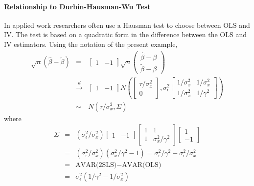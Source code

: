 \documentclass[12pt]{article}
\theoremstyle{definition}
\begin{document}
\paragraph{Relationship to Durbin-Hausman-Wu Test} In applied work researchers often use a Hausman test to choose between OLS and IV. The test is based on a quadratic form in the difference between the OLS and IV estimators. Using the notation of the present example, 
  \begin{eqnarray*}
    \sqrt{n}\left(\widehat{\beta} - \widetilde{\beta}\right) &=&\left[\begin{array}{cc}
    1 & -1
    \end{array}\right] \sqrt{n} \left(\begin{array}{c}
    \widehat{\beta} - \beta  \\ \widetilde{\beta} - \beta
    \end{array} \right)\\
     &\overset{d}{\rightarrow}& \left[\begin{array}{cc}
    1 & -1
    \end{array}\right]
    N\left(\left[
      \begin{array}{c}
        \tau/\sigma_x^2 \\ 0
      \end{array}\right],\sigma_\epsilon^2\left[
        \begin{array}{cc}
          1/\sigma_x^2 & 1/\sigma_x^2 \\
          1/\sigma_x^2 & 1/\gamma^2
        \end{array}
      \right]
    \right)\\
    &\sim& N\left(\tau/\sigma_x^2, \Sigma
    \right)
  \end{eqnarray*}
where
    \begin{eqnarray*}
      \Sigma &=& (\sigma_\epsilon^2/\sigma_x^2) \left[\begin{array}{cc}
    1 & -1
    \end{array}\right]
      \left[
        \begin{array}{cc}
          1&1\\
          1&\sigma_x^2/\gamma^2
        \end{array}
      \right]
    \left[\begin{array}{c}
    1 \\ -1
    \end{array}\right]\\
        &=& (\sigma_\epsilon^2/\sigma_x^2)(\sigma_x^2/\gamma^2 - 1) = \sigma_\epsilon^2/\gamma^2 - \sigma_\epsilon^2/\sigma_x^2 \\
        &=& \mbox{AVAR(2SLS)} - \mbox{AVAR(OLS)}\\
        &=& \sigma_\epsilon^2 \left(1/\gamma^2 - 1/\sigma_x^2 \right)
    \end{eqnarray*}
\end{document}
